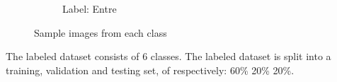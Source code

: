 \begin{figure}[H]
\begin{subfigure}[b]{0.3\textwidth}
      \caption{Label: Entre}
      \label{fig:4}
    \end{subfigure}
    \caption{Sample images from each class}
    \label{fig:misfoster}
\end{figure}
The labeled dataset consists of 6 classes. The labeled dataset is split into a training, validation and testing set, of respectively: 60\% 20\% 20\%.
\begin{table}[H]
    \caption{Labeled images from various Danish real-estate pages}
    \label{tab:datadist}
\end{table}
